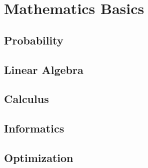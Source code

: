 
\chapter{Mathematics Basics}
\label{chapter2}

\section{Probability}
\label{section2.1}

\section{Linear Algebra}
\label{section2.2}

\section{Calculus}
\label{section2.3}

\section{Informatics}
\label{section2.4}

\section{Optimization}
\label{section2.5}